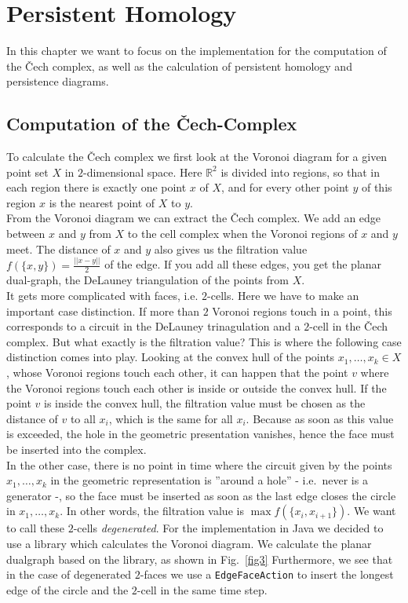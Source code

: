 \documentclass[11pt, a4paper, UKenglish]{article}
\newcommand{\bR}{\mathbb{R}}
\begin{document}
    \section{Persistent Homology}\label{sec:persistent-homology2}

    In this chapter we want to focus on the implementation for the computation of the Čech complex, as well as the calculation of persistent homology and persistence diagrams.

    \subsection{Computation of the Čech-Complex}\label{subsec:čech-complex}

    To calculate the Čech complex we first look at the Voronoi diagram for a given point set $X$ in $2$-dimensional space.
    Here $\bR^2$ is divided into regions, so that in each region there is exactly one point $x$ of $X$, and for every other point $y$ of this region $x$ is the nearest point of $X$ to $y$.\\
    From the Voronoi diagram we can extract the Čech complex.
    We add an edge between $x$ and $y$ from $X$ to the cell complex when the Voronoi regions of $x$ and $y$ meet.
    The distance of $x$ and $y$ also gives us the filtration value $f(\{x,y\}) = \frac{||x-y||}{2}$ of the edge.
    If you add all these edges, you get the planar dual-graph, the DeLauney triangulation of the points from $X$.\\
    It gets more complicated with faces, i.e. $2$-cells.
    Here we have to make an important case distinction.
    If more than $2$ Voronoi regions touch in a point, this corresponds to a circuit in the DeLauney trinagulation and a $2$-cell in the Čech complex.
    But what exactly is the filtration value?
    This is where the following case distinction comes into play.
    Looking at the convex hull of the points $x_1,\ldots,x_k\in X$, whose Voronoi regions touch each other, it can happen that the point $v$ where the Voronoi regions touch each other is inside or outside the convex hull.
    If the point $v$ is inside the convex hull, the filtration value must be chosen as the distance of $v$ to all $x_i$, which is the same for all $x_i$.
    Because as soon as this value is exceeded, the hole in the geometric presentation vanishes, hence the face must be inserted into the complex.\\
    
    In the other case, there is no point in time where the circuit given by the points $x_1,\ldots,x_k$ in the geometric representation is ''around a hole'' - i.e.\ never is a generator -, so the face must be inserted as soon as the last edge closes the circle in $x_1,\ldots,x_k$.
    In other words, the filtration value is $\max f(\{x_i,x_{i+1}\})$.
    We want to call these $2$-cells \textit{degenerated}.
    For the implementation in Java we decided to use a library which calculates the Voronoi diagram.
    We calculate the planar dualgraph based on the library, as shown in Fig.~\ref{fig3} Furthermore, we see that in the case of degenerated $2$-faces we use a \texttt{EdgeFaceAction} to insert the longest edge of the circle and the $2$-cell in the same time step.
\end{document}
